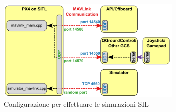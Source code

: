 \begin{figure}
	\centering
	\includegraphics[width=0.8\textwidth]{DescrizioneAutopilota/Figure/INTERSIL}
	\caption{Configurazione per effettuare le simulazioni SIL}
	\label{fig:ig:INTERSIL}
\end{figure}


